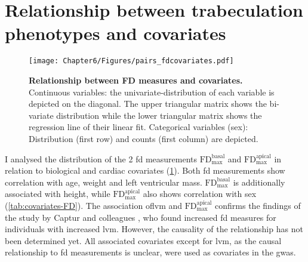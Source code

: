 \section{Relationship between trabeculation phenotypes and covariates}
\begin{figure}[hbtp]
	\centering
	\texttt{[image: Chapter6/Figures/pairs\_fdcovariates.pdf]}
	\caption[\textbf{Relationship between FD measures and covariates. }]{\textbf{Relationship between FD measures and covariates. }Continuous variables: the univariate-distribution of each variable is depicted on the diagonal. The upper triangular matrix shows the bi-variate distribution while the lower triangular matrix shows the regression line of their linear fit. Categorical variables (sex): Distribution (first row) and counts (first column) are depicted. } 
	 	\label{fig:covariates-FD}
\end{figure}

I analysed the distribution of the \num{2} \gls{fd} measurements  \(\text{FD}_\text{max}^\text{basal}\) and \(\text{FD}_\text{max}^\text{apical}\) in relation to biological and cardiac covariates (\cref{fig:covariates-FD}). Both \gls{fd} measurements show correlation with age, weight and left ventricular mass.   \(\text{FD}_\text{max}^\text{basal}\) is additionally associated with height, while \(\text{FD}_\text{max}^\text{apical}\) also shows correlation with sex (\cref{tab:covariates-FD}). The association of\gls{lvm} and \(\text{FD}_\text{max}^\text{apical}\)  confirms the findings of the study by Captur and colleagues \citep{Captur2014}, who found increased \gls{fd} measures for individuals with increased \gls{lvm}. However, the causality of the relationship has not been determined yet. All associated covariates except for \gls{lvm}, as the causal relationship to \gls{fd} measurements is unclear, were used as covariates in the \gls{gwas}. 

